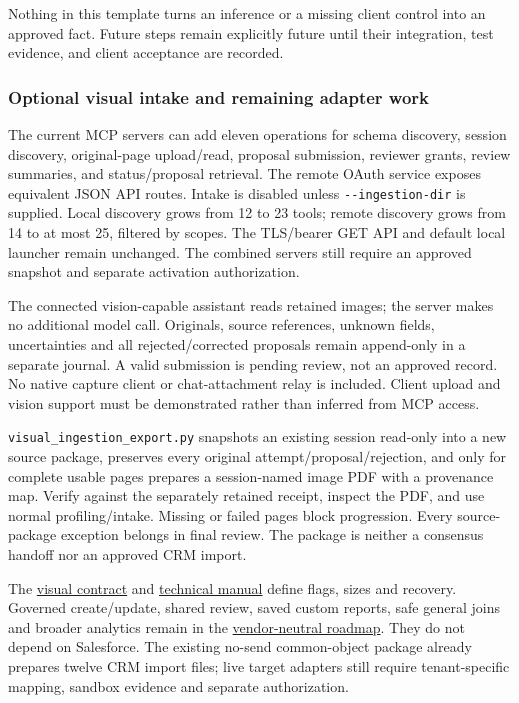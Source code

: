 \documentclass[
]{article}
\begin{document}
Nothing in this template turns an inference or a missing client control
into an approved fact. Future steps remain explicitly future until their
integration, test evidence, and client acceptance are recorded.

\subsubsection{Optional visual intake and remaining adapter
work}\label{optional-visual-intake-and-remaining-adapter-work}

The current MCP servers can add eleven operations for schema discovery,
session discovery, original-page upload/read, proposal submission,
reviewer grants, review summaries, and status/proposal retrieval. The
remote OAuth service exposes equivalent JSON API routes. Intake is
disabled unless \texttt{-\/-ingestion-dir} is supplied. Local discovery
grows from 12 to 23 tools; remote discovery grows from 14 to at most 25,
filtered by scopes. The TLS/bearer GET API and default local launcher
remain unchanged. The combined servers still require an approved
snapshot and separate activation authorization.

The connected vision-capable assistant reads retained images; the server
makes no additional model call. Originals, source references, unknown
fields, uncertainties and all rejected/corrected proposals remain
append-only in a separate journal. A valid submission is pending review,
not an approved record. No native capture client or chat-attachment
relay is included. Client upload and vision support must be demonstrated
rather than inferred from MCP access.

\texttt{visual\_\allowbreak{}ingestion\_\allowbreak{}export.py}
snapshots an existing session read-only into a new source package,
preserves every original attempt/proposal/rejection, and only for
complete usable pages prepares a session-named image PDF with a
provenance map. Verify against the separately retained receipt, inspect
the PDF, and use normal profiling/intake. Missing or failed pages block
progression. Every source-package exception belongs in final review. The
package is neither a consensus handoff nor an approved CRM import.

The \href{../references/visual-ingestion.md}{visual contract} and
\href{TECHNICAL_DOCUMENTATION.md}{technical manual} define flags, sizes
and recovery. Governed create/update, shared review, saved custom
reports, safe general joins and broader analytics remain in the
\href{../references/business-data-platform-roadmap.md}{vendor-neutral
roadmap}. They do not depend on Salesforce. The existing no-send
common-object package already prepares twelve CRM import files; live
target adapters still require tenant-specific mapping, sandbox evidence
and separate authorization.
\end{document}
